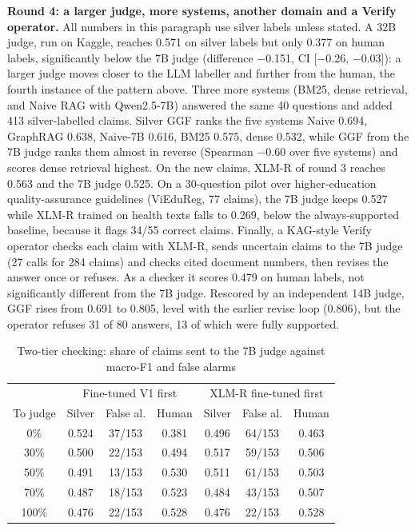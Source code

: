 \documentclass[conference]{IEEEtran}
\begin{document}
\textbf{Round 4: a larger judge, more systems, another domain and a Verify operator.} All numbers in this paragraph use silver labels unless stated. A 32B judge, run on Kaggle, reaches 0.571 on silver labels but only 0.377 on human labels, significantly below the 7B judge (difference $-$0.151, CI [$-$0.26, $-$0.03]): a larger judge moves closer to the LLM labeller and further from the human, the fourth instance of the pattern above. Three more systems (BM25, dense retrieval, and Naive RAG with Qwen2.5-7B) answered the same 40 questions and added 413 silver-labelled claims. Silver GGF ranks the five systems Naive 0.694, GraphRAG 0.638, Naive-7B 0.616, BM25 0.575, dense 0.532, while GGF from the 7B judge ranks them almost in reverse (Spearman $-$0.60 over five systems) and scores dense retrieval highest. On the new claims, XLM-R of round 3 reaches 0.563 and the 7B judge 0.525. On a 30-question pilot over higher-education quality-assurance guidelines (ViEduReg, 77 claims), the 7B judge keeps 0.527 while XLM-R trained on health texts falls to 0.269, below the always-supported baseline, because it flags 34/55 correct claims. Finally, a KAG-style Verify operator checks each claim with XLM-R, sends uncertain claims to the 7B judge (27 calls for 284 claims) and checks cited document numbers, then revises the answer once or refuses. As a checker it scores 0.479 on human labels, not significantly different from the 7B judge. Rescored by an independent 14B judge, GGF rises from 0.691 to 0.805, level with the earlier revise loop (0.806), but the operator refuses 31 of 80 answers, 13 of which were fully supported.

\begin{table}[t]
\caption{Two-tier checking: share of claims sent to the 7B judge against macro-F1 and false alarms}
\label{tab:cascade}
\centering
\footnotesize
\setlength{\tabcolsep}{3pt}
\begin{tabular}{ccccccc}
\toprule
 & \multicolumn{3}{c}{Fine-tuned V1 first} & \multicolumn{3}{c}{XLM-R fine-tuned first} \\
To judge & Silver & False al. & Human & Silver & False al. & Human \\
\midrule
0\% & 0.524 & 37/153 & 0.381 & 0.496 & 64/153 & 0.463 \\
30\% & 0.500 & 22/153 & 0.494 & 0.517 & 59/153 & 0.506 \\
50\% & 0.491 & 13/153 & 0.530 & 0.511 & 61/153 & 0.503 \\
70\% & 0.487 & 18/153 & 0.523 & 0.484 & 43/153 & 0.507 \\
100\% & 0.476 & 22/153 & 0.528 & 0.476 & 22/153 & 0.528 \\
\bottomrule
\end{tabular}
\end{table}
\end{document}
